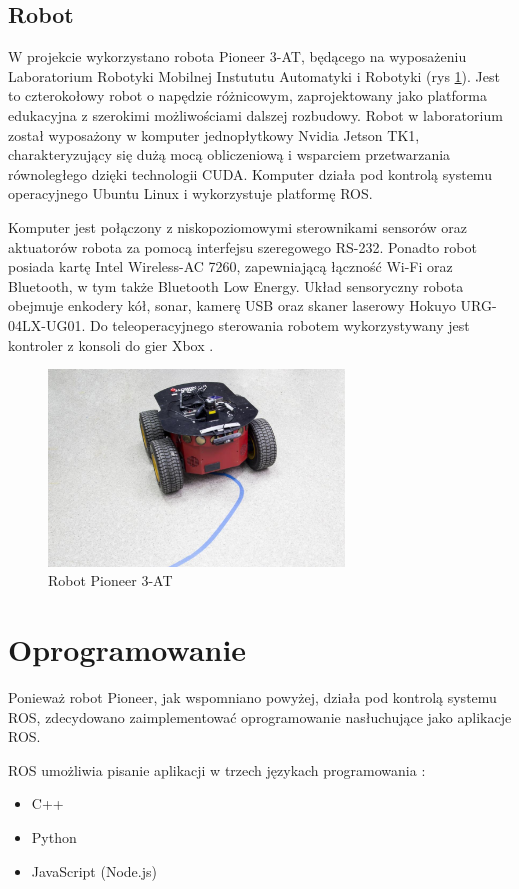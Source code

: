 \subsection{Robot}
W projekcie wykorzystano robota Pioneer 3-AT, będącego na wyposażeniu Laboratorium Robotyki Mobilnej Instututu Automatyki i Robotyki (rys \ref{fig:robot}). Jest to czterokołowy robot o napędzie różnicowym, zaprojektowany jako platforma edukacyjna z szerokimi możliwościami dalszej rozbudowy. Robot w laboratorium został wyposażony w komputer jednopłytkowy Nvidia Jetson TK1, charakteryzujący się dużą mocą obliczeniową i wsparciem przetwarzania równoległego dzięki technologii CUDA. Komputer działa pod kontrolą systemu operacyjnego Ubuntu Linux i wykorzystuje platformę ROS.

Komputer jest połączony z niskopoziomowymi sterownikami sensorów oraz aktuatorów robota za pomocą interfejsu szeregowego RS-232. Ponadto robot posiada kartę Intel Wireless-AC 7260, zapewniającą łączność Wi-Fi oraz Bluetooth, w tym także Bluetooth Low Energy. Układ sensoryczny robota obejmuje enkodery kół, sonar, kamerę USB oraz skaner laserowy Hokuyo URG-04LX-UG01. Do teleoperacyjnego sterowania robotem wykorzystywany jest kontroler z konsoli do gier Xbox \cite{daniel}.

\begin{figure}
\centering
\includegraphics[width=0.7\textwidth]{img/robot.jpg}
\caption{Robot Pioneer 3-AT \cite{daniel}}
\label{fig:robot}
\end{figure}

\section{Oprogramowanie}
Ponieważ robot Pioneer, jak wspomniano powyżej, działa pod kontrolą systemu ROS, zdecydowano zaimplementować oprogramowanie nasłuchujące jako aplikacje ROS. 

ROS umożliwia pisanie aplikacji w trzech językach programowania \cite{roswiki} \cite{learning_ros}: 
\begin{itemize}
 \item C++
 \item Python
 \item JavaScript (Node.js)
\end{itemize}

